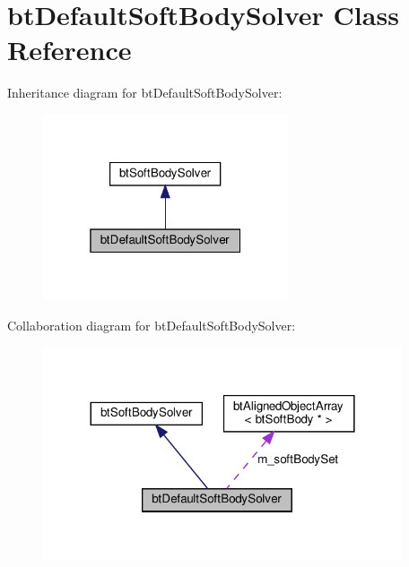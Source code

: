 \hypertarget{classbtDefaultSoftBodySolver}{}\section{bt\+Default\+Soft\+Body\+Solver Class Reference}
\label{classbtDefaultSoftBodySolver}


Inheritance diagram for bt\+Default\+Soft\+Body\+Solver\+:
\nopagebreak
\begin{figure}[H]
\begin{center}
\leavevmode
\includegraphics[width=205pt]{classbtDefaultSoftBodySolver__inherit__graph}
\end{center}
\end{figure}


Collaboration diagram for bt\+Default\+Soft\+Body\+Solver\+:
\nopagebreak
\begin{figure}[H]
\begin{center}
\leavevmode
\includegraphics[width=300pt]{classbtDefaultSoftBodySolver__coll__graph}
\end{center}
\end{figure}
